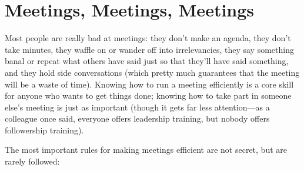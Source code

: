 \chapter{Meetings, Meetings, Meetings}\label{s:meetings}

Most people are really bad at meetings:
they don't make an agenda,
they don't take minutes,
they waffle on or wander off into irrelevancies,
they say something banal or repeat what others have said
just so that they'll have said something,
and they hold side conversations
(which pretty much guarantees that the meeting will be a waste of time).
Knowing how to run a meeting efficiently
is a core skill for anyone who wants to get things done;
knowing how to take part in someone else's meeting is just as important
(though it gets far less attention---as a colleague once said,
everyone offers leadership training,
but nobody offers followership training).

The most important rules for making meetings efficient are not secret,
but are rarely followed:

